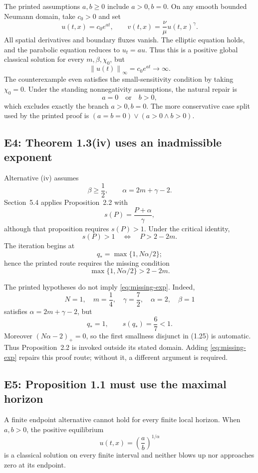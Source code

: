 \documentclass[11pt]{article}
\newcommand{\norm}[1]{\left\lVert #1\right\rVert}
\begin{document}
The printed assumptions \(a,b\ge0\) include \(a>0,b=0\).  On any smooth
bounded Neumann domain, take \(c_0>0\) and set
\[
 u(t,x)=c_0e^{at},\qquad
 v(t,x)=\frac{\nu}{\mu}u(t,x)^\gamma.
\]
All spatial derivatives and boundary fluxes vanish.  The elliptic equation
holds, and the parabolic equation reduces to \(u_t=au\).  Thus this is a
positive global classical solution for every \(m,\beta,\chi_0\), but
\[
 \norm{u(t)}_\infty=c_0e^{at}\longrightarrow\infty.
\]
The counterexample even satisfies the small-sensitivity condition by taking
\(\chi_0=0\).  Under the standing nonnegativity assumptions, the natural
repair is
\[
  a=0\quad\text{or}\quad b>0,
\]
which excludes exactly the branch \(a>0,b=0\).  The more conservative
case split used by the printed proof is
\((a=b=0)\lor(a>0\land b>0)\).

\subsection{E4: Theorem 1.3(iv) uses an inadmissible exponent}

Alternative (iv) assumes
\[
 \beta\ge\frac12,\qquad \alpha=2m+\gamma-2.
\]
Section~5.4 applies Proposition~2.2 with
\[
 s(P)=\frac{P+\alpha}{\gamma},
\]
although that proposition requires \(s(P)>1\).  Under the critical identity,
\[
 s(P)>1
 \quad\Longleftrightarrow\quad
 P>2-2m.
\]
The iteration begins at
\[
 q_*=\max\{1,N\alpha/2\};
\]
hence the printed route requires the missing condition
\begin{equation}
 \boxed{\max\{1,N\alpha/2\}>2-2m.}                     \label{eq:missing-exp}
\end{equation}

The printed hypotheses do not imply \eqref{eq:missing-exp}.  Indeed,
\[
 N=1,\quad m=\frac14,\quad \gamma=\frac72,\quad
 \alpha=2,\quad\beta=1
\]
satisfies \(\alpha=2m+\gamma-2\), but
\[
 q_*=1,\qquad s(q_*)=\frac67<1.
\]
Moreover \((N\alpha-2)_+=0\), so the first smallness disjunct in (1.25) is
automatic.  Thus Proposition~2.2 is invoked outside its stated domain.
Adding \eqref{eq:missing-exp} repairs this proof route; without it, a
different argument is required.

\subsection{E5: Proposition 1.1 must use the maximal horizon}

A finite endpoint alternative cannot hold for every finite local horizon.
When \(a,b>0\), the positive equilibrium
\[
 u(t,x)=\left(\frac ab\right)^{1/\alpha}
\]
is a classical solution on every finite interval and neither blows up nor
approaches zero at its endpoint.
\end{document}
